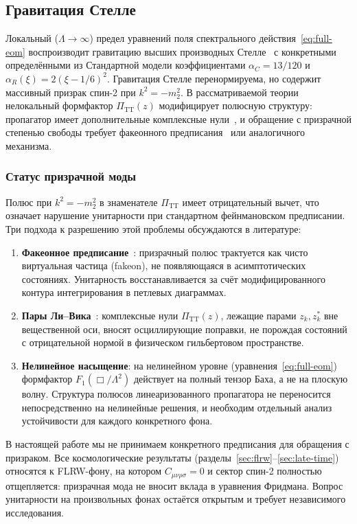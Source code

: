 \documentclass[12pt,a4paper]{article}
\newcommand{\PiTT}{\Pi_{\mathrm{TT}}}
\newcommand{\Lam}{\Lambda}
\theoremstyle{plain}
\theoremstyle{definition}
\begin{document}
\subsection{Гравитация Стелле}

Локальный ($\Lam \to \infty$) предел уравнений поля
спектрального действия~\eqref{eq:full-eom} воспроизводит гравитацию высших производных
Стелле~\cite{Stelle:1976gc,Stelle:1978} с конкретными определёнными из
Стандартной модели коэффициентами $\alpha_C = 13/120$ и $\alpha_R(\xi) = 2(\xi - 1/6)^2$.  Гравитация
Стелле перенормируема, но содержит массивный призрак спин-2 при
$k^2 = -m_2^2$.  В рассматриваемой теории нелокальный формфактор $\PiTT(z)$ модифицирует
полюсную структуру: пропагатор имеет дополнительные комплексные
нули~\cite{Alfyorov:2026ff,Biswas:2011ar}, и обращение с призрачной
степенью свободы требует факеонного
предписания~\cite{Calcagni:2018gke} или аналогичного механизма.

\subsubsection{Статус призрачной моды}

Полюс при $k^2 = -m_2^2$ в знаменателе $\PiTT$ имеет отрицательный
вычет, что означает нарушение унитарности при стандартном фейнмановском
предписании.  Три подхода к разрешению этой проблемы обсуждаются в
литературе:
\begin{enumerate}[nosep]
  \item \textbf{Факеонное предписание}~\cite{Anselmi:2017ygm}:
    призрачный полюс трактуется как чисто виртуальная частица (fakeon),
    не появляющаяся в асимптотических состояниях.  Унитарность
    восстанавливается за счёт модифицированного контура интегрирования
    в петлевых диаграммах.
  \item \textbf{Пары Ли--Вика}~\cite{Modesto:2015ozb}: комплексные нули
    $\PiTT(z)$, лежащие парами $z_k, z_k^*$ вне вещественной оси,
    вносят осциллирующие поправки, не порождая состояний с отрицательной
    нормой в физическом гильбертовом пространстве.
  \item \textbf{Нелинейное насыщение}: на нелинейном уровне
    (уравнения~\eqref{eq:full-eom}) формфактор $F_1(\Box/\Lam^2)$
    действует на полный тензор Баха, а не на плоскую волну.  Структура
    полюсов линеаризованного пропагатора не переносится непосредственно
    на нелинейные решения, и необходим отдельный анализ устойчивости для
    каждого конкретного фона.
\end{enumerate}
В настоящей работе мы не принимаем конкретного предписания для обращения
с призраком.  Все космологические результаты (разделы~\ref{sec:flrw}--\ref{sec:late-time}) относятся к FLRW-фону, на котором
$C_{\mu\nu\rho\sigma} = 0$ и сектор спин-2 полностью отщепляется:
призрачная мода не вносит вклада в уравнения Фридмана.  Вопрос
унитарности на произвольных фонах остаётся открытым и требует
независимого исследования.
\end{document}
